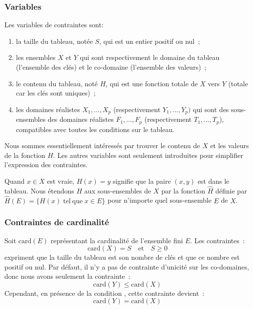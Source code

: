 \subsubsection{Variables}

Les variables de contraintes sont:
%
\begin{enumerate}

\item la taille du tableau, notée $S$, qui est un entier positif ou nul~;

\item les ensembles $X$ et $Y$ qui sont respectivement le domaine du tableau
(l'ensemble des clés) et le co-domaine (l'ensemble des valeurs)~;

\item le contenu du tableau, noté $H$, qui est une fonction totale de $X$ vers
$Y$ (totale car les clés sont uniques)~;

\item les domaines réalistes $X_1, \dots, X_p$ (respectivement $Y_1, \dots,
Y_p)$ qui sont des sous-ensembles des domaines réalistes $F_1, \dots, F_p$
(respectivement $T_1, \dots, T_p$), compatibles avec toutes les conditions sur
le tableau.

\end{enumerate}

Nous sommes essentiellement intéressés par trouver le contenu de $X$ et les
valeurs de la fonction $H$. Les autres variables sont seulement introduites pour
simplifier l'expression des contraintes.

Quand $x \in X$ est vraie, $H(x) = y$ signifie que la paire $(x, y)$ est dans le
tableau. Nous étendons $H$ aux sous-ensembles de $X$ par la fonction $\hat{H}$
définie par $\hat{H}(E) = \{H(x) \;\mathrm{tel~que}\; x \in E\}$ pour
n'importe quel sous-ensemble $E$ de $X$.

\subsubsection{Contraintes de cardinalité}

Soit $\mathrm{card}(E)$ représentant la cardinalité de l'ensemble fini $E$. Les
contraintes~:
%
$$\mathrm{card}(X) = S \quad\mathrm{et}\quad S \geq 0$$
%
expriment que la taille du tableau est son nombre de clés et que ce nombre est
positif ou nul. Par défaut, il n'y a pas de contrainte d'unicité sur les
co-domaines, donc nous avons seulement la contrainte~:
%
$$\mathrm{card}(Y) \leq \mathrm{card}(X)$$
%
Cependant, en présence de la condition , cette contrainte
devient~:
%
$$\mathrm{card}(Y) = \mathrm{card}(X)$$

